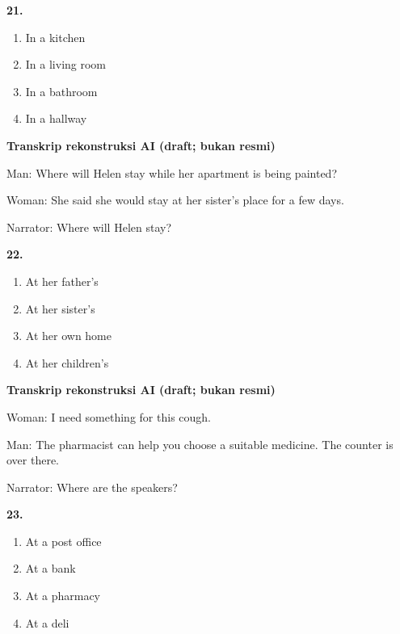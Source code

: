 \documentclass[12pt]{article}
\begin{document}
\noindent\textbf{21.}
\begin{enumerate}[label=(\Alph*),leftmargin=*,itemsep=0.2em]
\item In a kitchen
\item In a living room
\item In a bathroom
\item In a hallway
\end{enumerate}
\par
\vspace{0.25\baselineskip}
\begin{exampleblock}
\textbf{Transkrip rekonstruksi AI (draft; bukan resmi)}\par
Man: Where will Helen stay while her apartment is being painted?\par
Woman: She said she would stay at her sister's place for a few days.\par
Narrator: Where will Helen stay?\par
\end{exampleblock}
\noindent\textbf{22.}
\begin{enumerate}[label=(\Alph*),leftmargin=*,itemsep=0.2em]
\item At her father's
\item At her sister's
\item At her own home
\item At her children's
\end{enumerate}
\par
\vspace{0.25\baselineskip}
\begin{exampleblock}
\textbf{Transkrip rekonstruksi AI (draft; bukan resmi)}\par
Woman: I need something for this cough.\par
Man: The pharmacist can help you choose a suitable medicine. The counter is over there.\par
Narrator: Where are the speakers?\par
\end{exampleblock}
\noindent\textbf{23.}
\begin{enumerate}[label=(\Alph*),leftmargin=*,itemsep=0.2em]
\item At a post office
\item At a bank
\item At a pharmacy
\item At a deli
\end{enumerate}
\par
\vspace{0.25\baselineskip}
\end{document}
